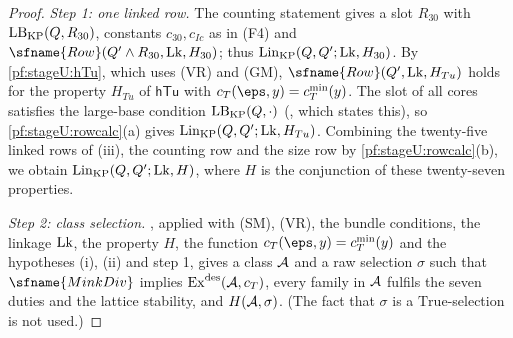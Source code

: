 \begin{proof}
\emph{Step 1: one linked row.} The counting statement gives a slot $R_{30}$ with $\mathrm{LB}_{\mathrm{KP}}(Q,R_{30})$, constants
$c_{30},c_{Ic}$ as in (F4) and $\sfname{Row}(Q'\stageUand R_{30},\stageULk,H_{30})$; thus
$\mathrm{Lin}_{\mathrm{KP}}(Q,Q';\mathrm{Lk},H_{30})$. By \cref{pf:stageU:hTu}, which uses (VR) and (GM),
$\sfname{Row}(Q',\stageULk,H_{Tu})$ holds for the property $H_{Tu}$ of $\mathsf{hTu}$ with $c_T(\eps,y)=c_T^{\min}(y)$. The slot
of all cores satisfies the large-base condition $\mathrm{LB}_{\mathrm{KP}}(Q,\cdot)$
(, which states this), so \cref{pf:stageU:rowcalc}(a) gives
$\mathrm{Lin}_{\mathrm{KP}}(Q,Q';\mathrm{Lk},H_{Tu})$. Combining the twenty-five linked rows of (iii), the counting row and the size
row by \cref{pf:stageU:rowcalc}(b), we obtain $\mathrm{Lin}_{\mathrm{KP}}(Q,Q';\mathrm{Lk},H)$, where $H$ is the conjunction of
these twenty-seven properties.

\emph{Step 2: class selection.} , applied with (SM), (VR), the bundle conditions, the linkage
$\mathrm{Lk}$, the property $H$, the function $c_T(\eps,y)=c_T^{\min}(y)$ and the hypotheses (i), (ii) and step 1, gives a class
$\mathcal{A}$ and a raw selection $\sigma$ such that $\sfname{MinkDiv}$ implies $\mathrm{Ex}^{\mathrm{des}}(\mathcal{A},c_T)$, every
family in $\mathcal{A}$ fulfils the seven duties and the lattice stability, and $H(\mathcal{A},\sigma)$. (The fact that $\sigma$ is a
$\mathrm{True}$-selection is not used.)


\end{proof}
